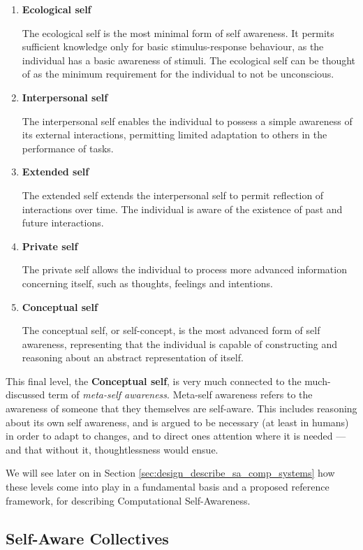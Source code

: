 	\begin{enumerate}
		\item \textbf{Ecological self}
		
		The ecological self is the most minimal form of self awareness. It permits sufficient knowledge only for basic stimulus-response behaviour, as the individual has a basic awareness of stimuli. The ecological self can be thought of as the minimum requirement for the individual to not be unconscious.
		\item \textbf{Interpersonal self}
		
		The interpersonal self enables the individual to possess a simple awareness of its external interactions, permitting limited adaptation to others in the performance of tasks.
		\item \textbf{Extended self}
		
		The extended self extends the interpersonal self to permit reflection of interactions over time. The individual is aware of the existence of past and future interactions.
		\item \textbf{Private self}
		
		The private self allows the individual to process more advanced information concerning itself, such as thoughts, feelings and intentions.
		
		\item \textbf{Conceptual self}
		
		The conceptual self, or self-concept, is the most advanced form of self awareness, representing that the individual is capable of constructing and reasoning about an abstract representation of itself.
	\end{enumerate}

	This final level, the \textbf{Conceptual self}, is very much connected to the much-discussed term of \textit{meta-self awareness}. Meta-self awareness refers to the awareness of someone that they themselves are self-aware. This includes reasoning about its own self awareness, and is argued to be necessary (at least in humans) in order to adapt to changes, and to direct ones attention where it is needed — and that without it, thoughtlessness would ensue.

	We will see later on in Section \ref{sec:design_describe_sa_comp_systems} how these levels come into play in a fundamental basis and a proposed reference framework, for describing Computational Self-Awareness.


	\subsection{Self-Aware Collectives}
	\label{subsec:collective_SA}

